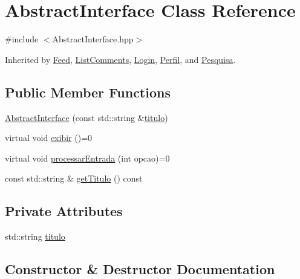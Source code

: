 \hypertarget{class_abstract_interface}{}\section{Abstract\+Interface Class Reference}
\label{class_abstract_interface}


{\ttfamily \#include $<$Abstract\+Interface.\+hpp$>$}



Inherited by \hyperlink{class_feed}{Feed}, \hyperlink{class_list_comments}{List\+Comments}, \hyperlink{class_login}{Login}, \hyperlink{class_perfil}{Perfil}, and \hyperlink{class_pesquisa}{Pesquisa}.

\subsection*{Public Member Functions}
\begin{DoxyCompactItemize}
\item 
\hyperlink{class_abstract_interface_ae63445e0c684ca6f80cf778280bdf339}{Abstract\+Interface} (const std\+::string \&\hyperlink{class_abstract_interface_ad3fcad6347738c58e5b9d092afb8a96e}{titulo})
\item 
virtual void \hyperlink{class_abstract_interface_a1d5d2a15e6e640bd0190a835cb64e5ed}{exibir} ()=0
\item 
virtual void \hyperlink{class_abstract_interface_acf8223a1da27c6986158836a57fa51ee}{processar\+Entrada} (int opcao)=0
\item 
const std\+::string \& \hyperlink{class_abstract_interface_a6384dbdd6913f2b4cf9fb8005a87e7df}{get\+Titulo} () const
\end{DoxyCompactItemize}
\subsection*{Private Attributes}
\begin{DoxyCompactItemize}
\item 
std\+::string \hyperlink{class_abstract_interface_ad3fcad6347738c58e5b9d092afb8a96e}{titulo}
\end{DoxyCompactItemize}


\subsection{Constructor \& Destructor Documentation}
\mbox{\label{class_abstract_interface_ae63445e0c684ca6f80cf778280bdf339}} 
